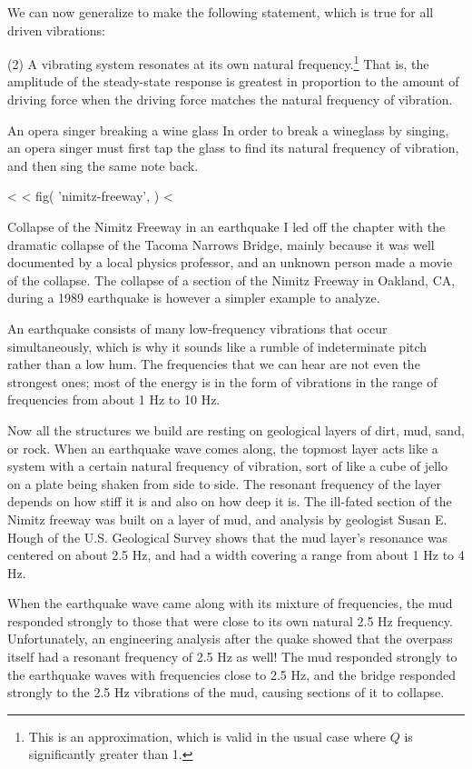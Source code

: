 We can now generalize to make the following statement, which
is true for all driven vibrations:

\begin{important}
(2) A vibrating system resonates at
its own natural frequency.\footnote{This is
an approximation, which is valid in the usual case where $Q$ is significantly greater than 1.} That is, the amplitude of the
steady-state response is greatest in proportion to the
amount of driving force when the driving force matches the
natural frequency of vibration.
\end{important}

\begin{eg}{An opera singer breaking a wine glass}
In order to break a wineglass by singing, an opera singer
must first tap the glass to find its natural frequency of
vibration, and then sing the same note back.
\end{eg}

<%
<%
  fig(
    'nimitz-freeway',
  )
<%
\begin{eg}{Collapse of the Nimitz Freeway in an earthquake}
I led off the chapter with the dramatic collapse of the
Tacoma Narrows Bridge, mainly because it was well
documented by a local physics professor, and an unknown
person made a movie of the collapse. The collapse of a section
of the Nimitz Freeway in Oakland, CA, during a 1989
earthquake is however a simpler example to analyze.

 An earthquake consists of many low-frequency vibrations
that occur simultaneously, which is why it sounds like a
rumble of indeterminate pitch rather than a low hum. The
frequencies that we can hear are not even the strongest
ones; most of the energy is in the form of vibrations in the
range of frequencies from about 1 Hz to 10 Hz.

 Now all the structures we build are resting on geological
layers of dirt, mud, sand, or rock. When an earthquake wave
comes along, the topmost layer acts like a system with a
certain natural frequency of vibration, sort of like a cube
of jello on a plate being shaken from side to side. The
resonant frequency of the layer depends on how stiff it is
and also on how deep it is. The ill-fated section of the
Nimitz freeway was built on a layer of mud, and analysis by
geologist Susan E. Hough of the U.S. Geological Survey
shows that the mud layer's resonance was centered on about
2.5 Hz, and had a width covering a range from about 1 Hz to 4 Hz.

 When the earthquake wave came along with its mixture of
frequencies, the mud responded strongly to those that were
close to its own natural 2.5 Hz frequency. Unfortunately, an
engineering analysis after the quake showed that the
overpass itself had a resonant frequency of 2.5 Hz as well!
The mud responded strongly to the earthquake waves with
frequencies close to 2.5 Hz, and the bridge responded
strongly to the 2.5 Hz vibrations of the mud, causing
sections of it to collapse.
\end{eg}

